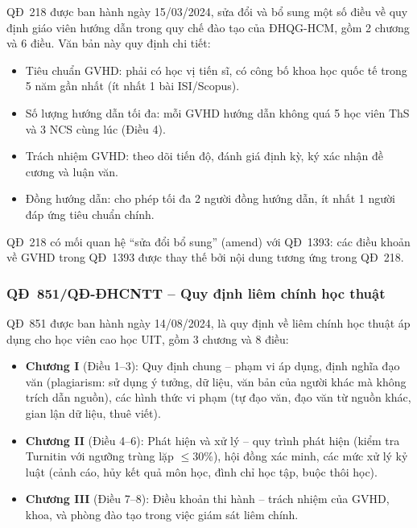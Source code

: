 QĐ~218 được ban hành ngày 15/03/2024, sửa đổi và bổ sung một số điều về quy định
giáo viên hướng dẫn trong quy chế đào tạo của ĐHQG-HCM, gồm 2 chương và 6 điều.
Văn bản này quy định chi tiết:

\begin{itemize}
  \item Tiêu chuẩn GVHD: phải có học vị tiến sĩ, có công bố khoa học quốc tế trong
        5 năm gần nhất (ít nhất 1 bài ISI/Scopus).
  \item Số lượng hướng dẫn tối đa: mỗi GVHD hướng dẫn không quá 5 học viên ThS và
        3 NCS cùng lúc (Điều 4).
  \item Trách nhiệm GVHD: theo dõi tiến độ, đánh giá định kỳ, ký xác nhận đề cương
        và luận văn.
  \item Đồng hướng dẫn: cho phép tối đa 2 người đồng hướng dẫn, ít nhất 1 người
        đáp ứng tiêu chuẩn chính.
\end{itemize}

QĐ~218 có mối quan hệ ``sửa đổi bổ sung'' (amend) với QĐ~1393: các điều khoản về
GVHD trong QĐ~1393 được thay thế bởi nội dung tương ứng trong QĐ~218.

\subsubsection*{QĐ~851/QĐ-ĐHCNTT -- Quy định liêm chính học thuật}

QĐ~851 được ban hành ngày 14/08/2024, là quy định về liêm chính học thuật áp dụng
cho học viên cao học UIT, gồm 3 chương và 8 điều:

\begin{itemize}
  \item \textbf{Chương I} (Điều 1--3): Quy định chung -- phạm vi áp dụng, định nghĩa
        đạo văn (plagiarism: sử dụng ý tưởng, dữ liệu, văn bản của người khác mà
        không trích dẫn nguồn), các hình thức vi phạm (tự đạo văn, đạo văn từ nguồn
        khác, gian lận dữ liệu, thuê viết).
  \item \textbf{Chương II} (Điều 4--6): Phát hiện và xử lý -- quy trình phát hiện
        (kiểm tra Turnitin với ngưỡng trùng lặp $\leq 30\%$), hội đồng xác minh,
        các mức xử lý kỷ luật (cảnh cáo, hủy kết quả môn học, đình chỉ học tập, buộc
        thôi học).
  \item \textbf{Chương III} (Điều 7--8): Điều khoản thi hành -- trách nhiệm của GVHD,
        khoa, và phòng đào tạo trong việc giám sát liêm chính.
\end{itemize}

